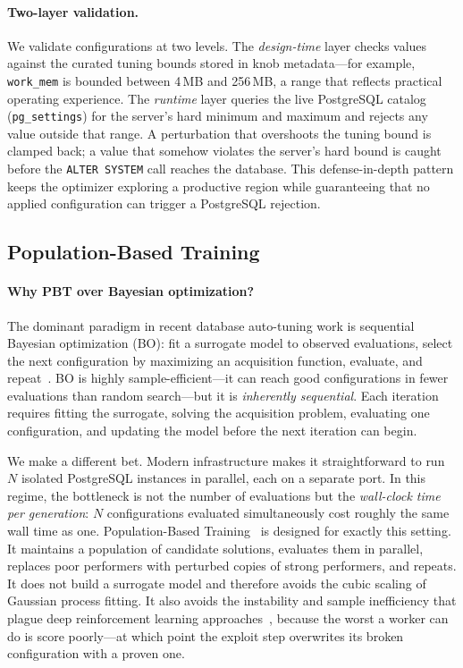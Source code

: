\paragraph{Two-layer validation.}
We validate configurations at two levels.  The \emph{design-time} layer
checks values against the curated tuning bounds stored in knob metadata---for
example, \texttt{work\_mem} is bounded between 4\,MB and 256\,MB, a range
that reflects practical operating experience.  The \emph{runtime} layer
queries the live PostgreSQL catalog (\texttt{pg\_settings}) for the server's
hard minimum and maximum and rejects any value outside that range.  A
perturbation that overshoots the tuning bound is clamped back; a value that
somehow violates the server's hard bound is caught before the
\texttt{ALTER~SYSTEM} call reaches the database.  This defense-in-depth
pattern keeps the optimizer exploring a productive region while guaranteeing
that no applied configuration can trigger a PostgreSQL rejection.

\subsection{Population-Based Training}
\label{ssec:pbt-algorithm}

\paragraph{Why PBT over Bayesian optimization?}
The dominant paradigm in recent database auto-tuning work is sequential
Bayesian optimization (BO): fit a surrogate model to observed evaluations,
select the next configuration by maximizing an acquisition function, evaluate,
and repeat~\cite{vanaken2017ottertune}.  BO is highly sample-efficient---it
can reach good configurations in fewer evaluations than random search---but it
is \emph{inherently sequential}.  Each iteration requires fitting the
surrogate, solving the acquisition problem, evaluating one configuration, and
updating the model before the next iteration can begin.

We make a different bet.  Modern infrastructure makes it straightforward to
run $N$ isolated PostgreSQL instances in parallel, each on a separate port.
In this regime, the bottleneck is not the number of evaluations but the
\emph{wall-clock time per generation}: $N$ configurations evaluated
simultaneously cost roughly the same wall time as one.  Population-Based
Training~\cite{jaderberg2017pbt} is designed for exactly this setting.  It
maintains a population of candidate solutions, evaluates them in parallel,
replaces poor performers with perturbed copies of strong performers, and
repeats.  It does not build a surrogate model and therefore avoids the cubic
scaling of Gaussian process fitting.  It also avoids the instability and
sample inefficiency that plague deep reinforcement learning
approaches~\cite{zhang2019cdbtune}, because the worst a worker can do is
score poorly---at which point the exploit step overwrites its broken
configuration with a proven one.

